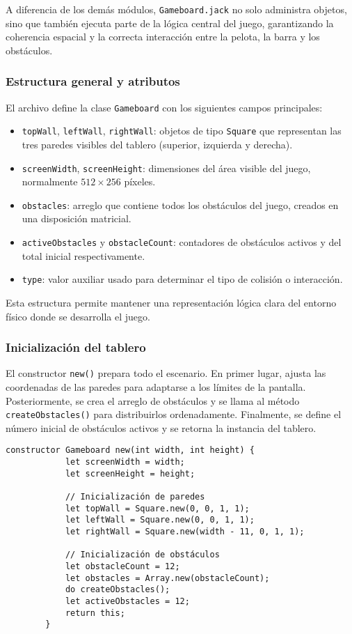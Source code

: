 \documentclass[twocolumn]{article}
\begin{document}
	A diferencia de los demás módulos, \texttt{Gameboard.jack} no solo administra objetos, sino que también ejecuta parte de la lógica central del juego, garantizando la coherencia espacial y la correcta interacción entre la pelota, la barra y los obstáculos.
	
	\subsubsection{Estructura general y atributos}
	El archivo define la clase \texttt{Gameboard} con los siguientes campos principales:
	
	\begin{itemize}
		\item \texttt{topWall}, \texttt{leftWall}, \texttt{rightWall}: objetos de tipo \texttt{Square} que representan las tres paredes visibles del tablero (superior, izquierda y derecha).
		\item \texttt{screenWidth}, \texttt{screenHeight}: dimensiones del área visible del juego, normalmente $512 \times 256$ píxeles.
		\item \texttt{obstacles}: arreglo que contiene todos los obstáculos del juego, creados en una disposición matricial.
		\item \texttt{activeObstacles} y \texttt{obstacleCount}: contadores de obstáculos activos y del total inicial respectivamente.
		\item \texttt{type}: valor auxiliar usado para determinar el tipo de colisión o interacción.
	\end{itemize}
	
	Esta estructura permite mantener una representación lógica clara del entorno físico donde se desarrolla el juego.
	
	\subsubsection{Inicialización del tablero}
	El constructor \texttt{new()} prepara todo el escenario. En primer lugar, ajusta las coordenadas de las paredes para adaptarse a los límites de la pantalla. Posteriormente, se crea el arreglo de obstáculos y se llama al método \texttt{createObstacles()} para distribuirlos ordenadamente.  
	Finalmente, se define el número inicial de obstáculos activos y se retorna la instancia del tablero.
	
	\begin{lstlisting}[caption=Constructor del tablero de juego]
		constructor Gameboard new(int width, int height) {
			let screenWidth = width;
			let screenHeight = height;
			
			// Inicialización de paredes
			let topWall = Square.new(0, 0, 1, 1);
			let leftWall = Square.new(0, 0, 1, 1);
			let rightWall = Square.new(width - 11, 0, 1, 1);
			
			// Inicialización de obstáculos
			let obstacleCount = 12;
			let obstacles = Array.new(obstacleCount);
			do createObstacles();
			let activeObstacles = 12; 
			return this;
		}
	\end{lstlisting}
	
\end{document}
